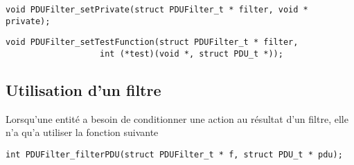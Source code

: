 \begin{verbatim}
void PDUFilter_setPrivate(struct PDUFilter_t * filter, void * private);
\end{verbatim}

\begin{verbatim}
void PDUFilter_setTestFunction(struct PDUFilter_t * filter, 
			       int (*test)(void *, struct PDU_t *));
\end{verbatim}

%
\subsection{Utilisation d'un filtre}

   Lorsqu'une entité a besoin de conditionner une action au résultat
d'un filtre, elle n'a qu'a utiliser la fonction suivante

\begin{verbatim}
int PDUFilter_filterPDU(struct PDUFilter_t * f, struct PDU_t * pdu);
\end{verbatim}
